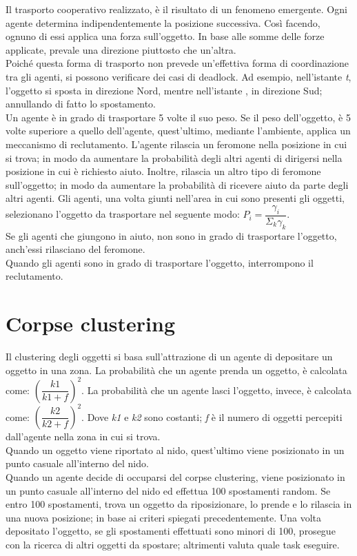 \documentclass[12pt,a4paper,openright,twoside]{report}
\begin{document}
Il trasporto cooperativo realizzato, è il risultato di un fenomeno emergente. Ogni agente determina indipendentemente la posizione successiva. Così facendo, ognuno di essi applica una forza sull'oggetto. In base alle somme delle forze applicate, prevale una direzione piuttosto che un'altra.\\
Poiché questa forma di trasporto non prevede un'effettiva forma di coordinazione tra gli agenti, si possono verificare dei casi di deadlock. Ad esempio, nell'istante \textit{t}, l'oggetto si sposta in direzione Nord, mentre nell'istante , in direzione Sud; annullando di fatto lo spostamento.\\
Un agente è in grado di trasportare 5 volte il suo peso. Se il peso dell'oggetto, è 5 volte superiore a quello dell'agente, quest'ultimo, mediante l'ambiente, applica un meccanismo di reclutamento. L'agente rilascia un feromone nella posizione in cui si trova; in modo da aumentare la probabilità degli altri agenti di dirigersi nella posizione in cui è richiesto aiuto. Inoltre, rilascia un altro tipo di feromone sull'oggetto; in modo da aumentare la probabilità di ricevere aiuto da parte degli altri agenti. Gli agenti, una volta giunti nell'area in cui sono presenti gli oggetti, selezionano l'oggetto da trasportare nel seguente modo: $P_i =\dfrac{\gamma_i}{\Sigma_k \gamma_k}$.\\
Se gli agenti che giungono in aiuto, non sono in grado di trasportare l'oggetto, anch'essi rilasciano del feromone.\\
Quando gli agenti sono in grado di trasportare l'oggetto, interrompono il reclutamento.

\section{Corpse clustering}

Il clustering degli oggetti si basa sull'attrazione di un agente di depositare un oggetto in una zona. La probabilità che un agente prenda un oggetto, è calcolata come: $(\dfrac{k1}{k1+f})^2$. La probabilità che un agente lasci l'oggetto, invece, è calcolata come: $(\dfrac{k2}{k2+f})^2$. Dove \textit{k1} e \textit{k2} sono costanti; \textit{f} è il numero di oggetti percepiti dall'agente nella zona in cui si trova.\\
Quando un oggetto viene riportato al nido, quest'ultimo viene posizionato in un punto casuale all'interno del nido.\\
Quando un agente decide di occuparsi del corpse clustering, viene posizionato in un punto casuale all'interno del nido ed effettua 100 spostamenti random. Se entro 100 spostamenti, trova un oggetto da riposizionare, lo prende e lo rilascia in una nuova posizione; in base ai criteri spiegati precedentemente. Una volta depositato l'oggetto, se gli spostamenti effettuati sono minori di 100, prosegue con la ricerca di altri oggetti da spostare; altrimenti valuta quale task eseguire.
\end{document}
